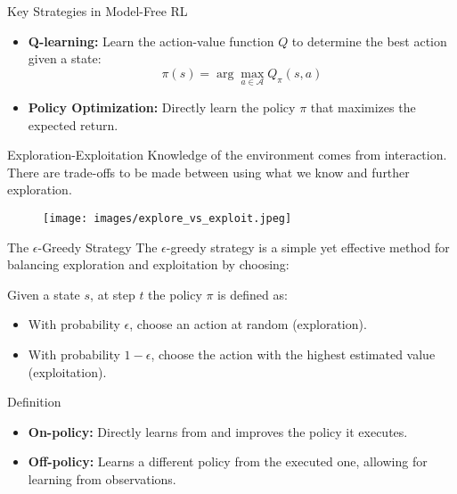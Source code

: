 \documentclass{beamer}
\begin{document}
\begin{frame}{Key Strategies in Model-Free RL}

\begin{block}{}
    \begin{itemize}
        \item \textbf{Q-learning:} Learn the action-value function \(Q\) to determine the best action given a state:
        \[\pi(s) = \arg\max_{a \in \mathcal{A}} Q_\pi(s, a)\]
        
        \item \textbf{Policy Optimization:} Directly learn the policy \(\pi\) that maximizes the expected return.
    \end{itemize}
\end{block}


\end{frame}





\begin{frame}{Exploration-Exploitation}
Knowledge of the environment comes from interaction. There are trade-offs to be made between using what we know and further exploration.
        \begin{figure}
        \centering
        \texttt{[image: images/explore\_vs\_exploit.jpeg]}
    \end{figure}
\end{frame}

\begin{frame}{The \(\epsilon\)-Greedy Strategy}
The \(\epsilon\)-greedy strategy is a simple yet effective method for balancing exploration and exploitation by choosing:

\begin{block}{}
Given a state \(s\), at step \(t\) the policy \(\pi\)  is defined as:
    \begin{itemize}
        \item With probability \(\epsilon\), choose an action at random (exploration).
        \item With probability \(1 - \epsilon\), choose the action with the highest estimated value (exploitation).
    \end{itemize}
\end{block}
\end{frame}

\begin{frame}{Definition}
    \begin{itemize}
    \item{\textbf{On-policy:} Directly learns from and improves the policy it executes.}
    \item{\textbf{Off-policy:} Learns a different policy from the executed one, allowing for learning from observations.}
    \end{itemize}
\end{frame}
\end{document}
